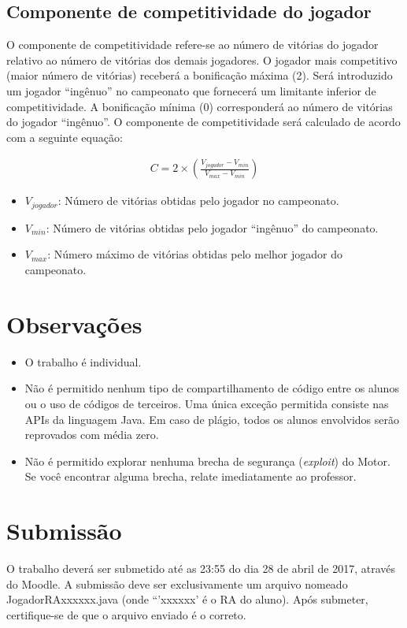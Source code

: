 \documentclass[10pt]{article}
\begin{document}
\subsection{Componente de competitividade do jogador}

O componente de competitividade refere-se ao número de vitórias do jogador relativo ao número de vitórias dos demais jogadores. O jogador mais competitivo (maior número de vitórias) receberá a bonificação máxima (2). Será introduzido um jogador ``ingênuo'' no campeonato que fornecerá um limitante inferior de competitividade. A bonificação mínima (0) corresponderá ao número de vitórias do jogador ``ingênuo''. O componente de competitividade será calculado de acordo com a seguinte equação:

\begin{align}
C = 2 \times \left(\frac{V_{jogador}-V_{min}}{V_{max}-V_{min}}\right) 
\end{align}

\begin{itemize}
    \item $V_{jogador}$: Número de vitórias obtidas pelo jogador no campeonato.
    \item $V_{min}$: Número de vitórias obtidas pelo jogador ``ingênuo'' do campeonato.
    \item $V_{max}$: Número máximo de vitórias obtidas pelo melhor jogador do campeonato.
\end{itemize}

\section{Observações}

\begin{itemize}
    \item O trabalho é individual.
    \item Não é permitido nenhum tipo de compartilhamento de código entre os alunos ou o uso de códigos de terceiros. Uma única exceção permitida consiste nas APIs da linguagem Java. Em caso de plágio, todos os alunos envolvidos serão reprovados com média zero. 
    \item Não é permitido explorar nenhuma brecha de segurança (\textit{exploit}) do Motor. Se você encontrar alguma brecha, relate imediatamente ao professor.
\end{itemize}
 
\section{Submissão}

O trabalho deverá ser submetido até as 23:55 do dia 28 de abril de 2017, através do Moodle. A submissão deve ser exclusivamente um arquivo nomeado JogadorRAxxxxxx.java (onde ``'xxxxxx' é o RA do aluno). Após submeter, certifique-se de que o arquivo enviado é o correto.
\end{document}
